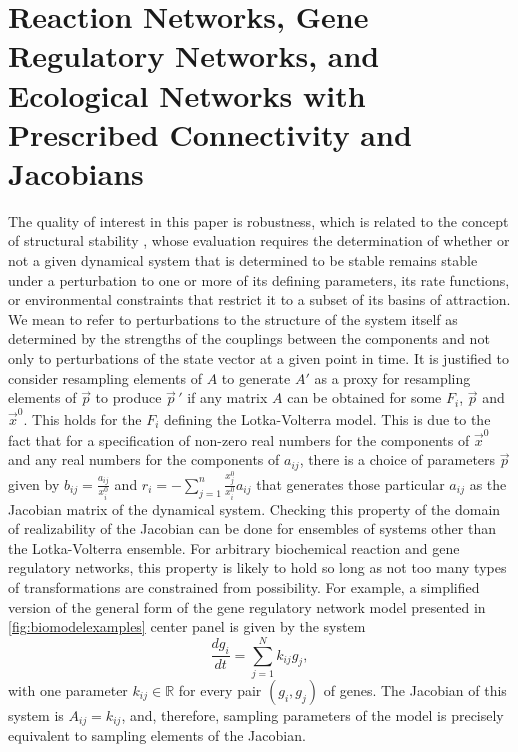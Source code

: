 

\section{Reaction Networks, Gene Regulatory Networks, and Ecological Networks with Prescribed Connectivity and Jacobians}\label{sec:reactionnetjacobian}

The quality of interest in this paper is robustness, which is related to the concept of structural stability \cite{Smale1967}, whose evaluation requires the determination of whether or not a given dynamical system that is determined to be stable remains stable under a perturbation to one or more of its defining parameters, its rate functions, or environmental constraints that restrict it to a subset of its basins of attraction. We mean to refer to perturbations to the structure of the system itself as determined by the strengths of the couplings between the components and not only to perturbations of the state vector at a given point in time. It is justified to consider resampling elements of $A$ to generate $A'$ as a proxy for resampling elements of $\vec{p}$ to produce $\vec{p}\,'$ if any matrix $A$ can be obtained for some $F_i$, $\vec{p}$ and $\vec{x}^0$. This holds for the $F_i$ defining the Lotka-Volterra model. This is due to the fact that for a specification of non-zero real numbers for the components of $\vec{x}^0$ and any real numbers for the components of $a_{ij}$, there is a choice of parameters $\vec{p}$ given by $b_{ij} = \frac{a_{ij}}{x_i^0}$ and $r_i = - \sum_{j=1}^n \frac{x_j^0}{x_i^0} a_{ij}$ that generates those particular $a_{ij}$ as the Jacobian matrix of the dynamical system. Checking this property of the domain of realizability of the Jacobian can be done for ensembles of systems other than the Lotka-Volterra ensemble. For arbitrary biochemical reaction and gene regulatory networks, this property is likely to hold so long as not too many types of transformations are constrained from possibility. For example, a simplified version of the general form of the gene regulatory network model presented in \ref{fig:biomodelexamples} center panel is given by the system
\begin{equation}
\frac{dg_i}{dt} = \sum_{j=1}^N k_{ij} g_j,
\end{equation}
with one parameter $k_{ij} \in \mathbb{R}$ for every pair $(g_i,g_j)$ of genes. The Jacobian of this system is $A_{ij} = k_{ij}$, and, therefore, sampling parameters of the model is precisely equivalent to sampling elements of the Jacobian.

